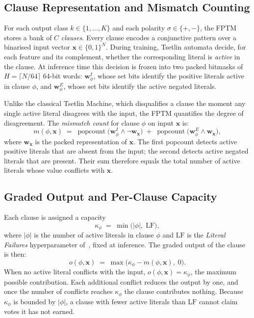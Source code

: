 \documentclass[journal,twoside,web]{ieeecolor}
\begin{document}
\subsection{Clause Representation and Mismatch Counting}
\label{sec:fptm-clause}
For each output class $k \in \{1,\ldots,K\}$ and each polarity
$\sigma \in \{+,-\}$, the FPTM stores a bank of $C$ \emph{clauses}.
Every clause encodes a conjunctive pattern over a binarised input
vector $\mathbf{x} \in \{0,1\}^{N}$.  During training, Tsetlin
automata decide, for each feature and its complement, whether the
corresponding literal is \emph{active} in the clause.  At inference
time this decision is frozen into two packed bitmasks of
$H = \lceil N/64 \rceil$ 64-bit words:
$\mathbf{w}^{I}_{\phi}$, whose set bits identify the positive
literals active in clause $\phi$, and
$\mathbf{w}^{E}_{\phi}$, whose set bits identify the active
negated literals.

Unlike the classical Tsetlin Machine, which disqualifies a clause
the moment any single active literal disagrees with the input, the
FPTM quantifies the degree of disagreement.  The
\emph{mismatch count} for clause $\phi$ on input $\mathbf{x}$ is:
%
\begin{equation}
  m(\phi,\mathbf{x})
  \;=\;
  \operatorname{popcount}\!\bigl(
      \mathbf{w}^{I}_{\phi} \wedge \neg\mathbf{w}_{\mathbf{x}}
  \bigr)
  \;+\;
  \operatorname{popcount}\!\bigl(
      \mathbf{w}^{E}_{\phi} \wedge \mathbf{w}_{\mathbf{x}}
  \bigr),
  \label{eq:mismatch}
\end{equation}
%
where $\mathbf{w}_{\mathbf{x}}$ is the packed representation of
$\mathbf{x}$. The first popcount detects active positive literals
that are absent from the input; the second detects active negated
literals that are present. Their sum therefore equals the total
number of active literals whose value conflicts with $\mathbf{x}$.

\subsection{Graded Output and Per-Clause Capacity}
\label{sec:fptm-graded}
Each clause is assigned a capacity
%
\begin{equation}
  \kappa_{\phi} \;=\; \min\!\bigl(|\phi|,\;\mathrm{LF}\bigr),
  \label{eq:kappa}
\end{equation}
%
where $|\phi|$ is the number of active literals in clause $\phi$ and
$\mathrm{LF}$ is the \emph{Literal Failures} hyperparameter
of~\cite{hnilov2025fptm}, fixed at inference. The graded output of
the clause is then:
%
\begin{equation}
  o(\phi,\mathbf{x})
  \;=\; \max\!\bigl(\kappa_{\phi} - m(\phi,\mathbf{x}),\;0\bigr).
  \label{eq:graded}
\end{equation}
%
When no active literal conflicts with the input,
$o(\phi,\mathbf{x}) = \kappa_{\phi}$, the maximum possible
contribution. Each additional conflict reduces the output by one,
and once the number of conflicts reaches $\kappa_{\phi}$ the clause
contributes nothing. Because $\kappa_{\phi}$ is bounded by
$|\phi|$, a clause with fewer active literals than $\mathrm{LF}$
cannot claim votes it has not earned.
\end{document}
